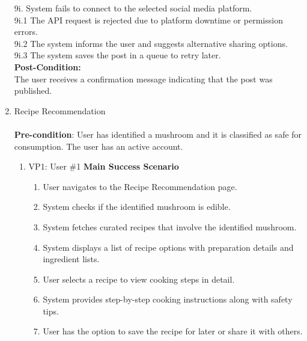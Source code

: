 \documentclass[]{article}
\begin{document}
\begin{enumerate}[{\bf BE1.}]
	9i. System fails to connect to the selected social media platform.\\
	9i.1 The API request is rejected due to platform downtime or permission errors.\\
	9i.2 The system informs the user and suggests alternative sharing options.\\
	9i.3 The system saves the post in a queue to retry later.\\
	
	\textbf{Post-Condition:}\\
	The user receives a confirmation message indicating that the post was published.


    \item Recipe Recommendation \\
    \\
    \textbf{Pre-condition}: User has identified a mushroom and it is classified as safe for consumption. The user has an active account.
    \begin{enumerate}[{\bf VP1.}]
		\item VP1: User \#1
		\textbf{Main Success Scenario}
		\begin{enumerate}
			\item User navigates to the Recipe Recommendation page.
			\item System checks if the identified mushroom is edible.
			\item System fetches curated recipes that involve the identified mushroom.
			\item System displays a list of recipe options with preparation details and ingredient lists.
			\item User selects a recipe to view cooking steps in detail.
			\item System provides step-by-step cooking instructions along with safety tips.
			\item User has the option to save the recipe for later or share it with others.
		\end{enumerate}
		

\end{enumerate}
\end{enumerate}
\end{document}
